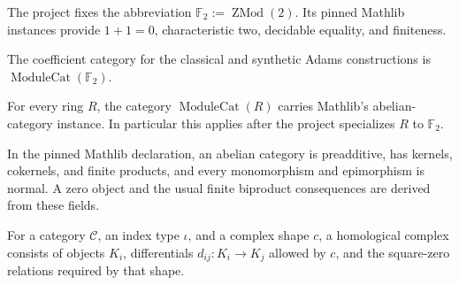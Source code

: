 \begin{definition}
  \label{def:core-f2}
  \leanok
  The project fixes the abbreviation
  $\mathbb F_2:=\operatorname{ZMod}(2)$.  Its pinned Mathlib instances provide
  $1+1=0$, characteristic two, decidable equality, and finiteness.
\end{definition}

\begin{definition}
  \label{def:core-f2-module-category}
  \leanok
  The coefficient category for the classical and synthetic Adams
  constructions is
  $\operatorname{ModuleCat}(\mathbb F_2)$.
\end{definition}

\begin{theorem}
  \label{thm:mathlib-module-category-abelian}
  \mathlibok
  For every ring $R$, the category $\operatorname{ModuleCat}(R)$ carries
  Mathlib's abelian-category instance.  In particular this applies after the
  project specializes $R$ to $\mathbb F_2$.
\end{theorem}

\begin{definition}
  \label{def:mathlib-abelian}
  \mathlibok
  In the pinned Mathlib declaration, an abelian category is preadditive, has
  kernels, cokernels, and finite products, and every monomorphism and
  epimorphism is normal.  A zero object and the usual finite biproduct
  consequences are derived from these fields.
\end{definition}

\begin{definition}
  \label{def:mathlib-homological-complex}
  \mathlibok
  For a category $\mathcal C$, an index type $\iota$, and a complex shape
  $c$, a homological complex consists of objects $K_i$, differentials
  $d_{ij}:K_i\to K_j$ allowed by $c$, and the square-zero relations required
  by that shape.
\end{definition}

